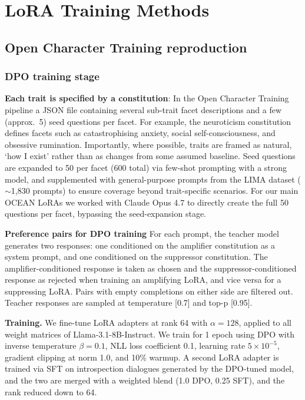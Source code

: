 \section{LoRA Training Methods}\label{sec:training-loras}

\subsection{Open Character Training reproduction}

\subsubsection{DPO training stage}

\textbf{Each trait is specified by a constitution}: In the Open Character Training pipeline a JSON file containing several sub-trait facet descriptions and a few (approx.\ 5) seed questions per facet. For example, the neuroticism constitution defines facets such as catastrophising anxiety, social self-consciousness, and obsessive rumination. Importantly, where possible, traits are framed as natural, `how I exist' rather than as changes from some assumed baseline. Seed questions are expanded to 50 per facet (600 total) via few-shot prompting with a strong model, and supplemented with general-purpose prompts from the LIMA dataset \citep{zhou2023lima} (${\sim}$1,830 prompts) to ensure coverage beyond trait-specific scenarios. For our main OCEAN LoRAs we worked with Claude Opus 4.7 to directly create the full 50 questions per facet, bypassing the seed-expansion stage.

\textbf{Preference pairs for DPO training} 
For each prompt, the teacher model generates two responses: one conditioned on the amplifier constitution as a system prompt, and one conditioned on the suppressor constitution. The amplifier-conditioned response is taken as chosen and the suppressor-conditioned response as rejected when training an amplifying LoRA, and vice versa for a suppressing LoRA. Pairs with empty completions on either side are filtered out. Teacher responses are sampled at temperature [0.7] and top-p [0.95].

\textbf{Training.} We fine-tune LoRA adapters \citep{hu2021lora} at rank 64 with $\alpha=128$, applied to all weight matrices of Llama-3.1-8B-Instruct. We train for 1 epoch using DPO with inverse temperature $\beta=0.1$, NLL loss coefficient 0.1, learning rate $5 \times 10^{-5}$, gradient clipping at norm 1.0, and 10\% warmup. A second LoRA adapter is trained via SFT on introspection dialogues generated by the DPO-tuned model, and the two are merged with a weighted blend (1.0 DPO, 0.25 SFT), and the rank reduced down to 64.

